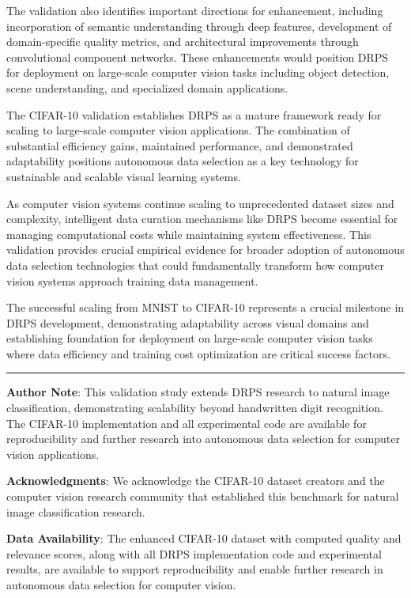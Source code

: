 \documentclass[12pt]{article}
\begin{document}
The validation also identifies important directions for enhancement, including incorporation of semantic understanding through deep features, development of domain-specific quality metrics, and architectural improvements through convolutional component networks. These enhancements would position DRPS for deployment on large-scale computer vision tasks including object detection, scene understanding, and specialized domain applications.

The CIFAR-10 validation establishes DRPS as a mature framework ready for scaling to large-scale computer vision applications. The combination of substantial efficiency gains, maintained performance, and demonstrated adaptability positions autonomous data selection as a key technology for sustainable and scalable visual learning systems.

As computer vision systems continue scaling to unprecedented dataset sizes and complexity, intelligent data curation mechanisms like DRPS become essential for managing computational costs while maintaining system effectiveness. This validation provides crucial empirical evidence for broader adoption of autonomous data selection technologies that could fundamentally transform how computer vision systems approach training data management.

The successful scaling from MNIST to CIFAR-10 represents a crucial milestone in DRPS development, demonstrating adaptability across visual domains and establishing foundation for deployment on large-scale computer vision tasks where data efficiency and training cost optimization are critical success factors.

\begin{center}\rule{0.5\linewidth}{0.5pt}\end{center}

\textbf{Author Note}: This validation study extends DRPS research to natural image classification, demonstrating scalability beyond handwritten digit recognition. The CIFAR-10 implementation and all experimental code are available for reproducibility and further research into autonomous data selection for computer vision applications.

\textbf{Acknowledgments}: We acknowledge the CIFAR-10 dataset creators and the computer vision research community that established this benchmark for natural image classification research.

\textbf{Data Availability}: The enhanced CIFAR-10 dataset with computed quality and relevance scores, along with all DRPS implementation code and experimental results, are available to support reproducibility and enable further research in autonomous data selection for computer vision.
\end{document}
